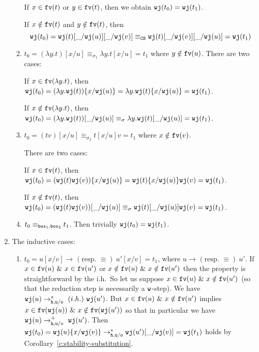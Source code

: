\documentclass{LMCS}
\renewcommand{\>}{\rightarrow}
\def\lam{\lambda}
\def\sig{\sigma}
\newcommand{\Rew}[1]{\rightarrow_{#1}}
\newcommand{\Rewnmod}[2]{\rightarrow^*_{#1/#2}}
\newcommand{\Rewplusmod}[2]{\rightarrow^+_{#1/#2}}
\newcommand{\isubs}[1]{ \{ #1  \} }
\newcommand{\dis}{{\tt j}}
\newcommand{\fv}[1]{{\tt fv}(#1)}
\newcommand{\proj}{\wfc}
\newcommand{\Gc}{{\tt w}}
\newcommand{\CS}{{\tt CS}}
\newcommand{\ih}{i.h.}
\newcommand{\wfc}{\Gc\dis}
\newcommand{\unboxed}{{\tt u}}
\newcommand{\osym}{{\tt o}}
\newcommand{\New}{{\tt h}}
\newcommand{\boite}{{\tt box}}
\newcommand{\sigt}{\boite_1}
\newcommand{\sigq}{\boite_2}
\newcommand{\void}{\_}
\begin{document}
\begin{enumerate}[$\bullet$]
\begin{enumerate}[$-$]
If $x \in \fv{t}$ or $y \in \fv{t}$, then we obtain $\proj(t_0) = \proj(t_1)$.

If $x \notin \fv{t}$ and $y \notin \fv{t}$, then 
$$\proj(t_0) = \proj(t)[\void/\proj(u)][\void/\proj(v)] \equiv_{\CS}
                \proj(t)[\void/\proj(v)][\void/\proj(u)] =\proj(t_1)$$  


\item $t_0 = (\lam y.t)[x/u]  \equiv_{\sig_1}  \lam y.t[x/u]= t_1$   
where $y \notin  \fv{u}$.
There are two  cases:

If $x \in \fv{\lam y. t}$, then $\proj(t_0) = (\lam y. \proj(t))\isubs{x/\proj(u)} = 
                    \lam y. \proj(t)\isubs{x/\proj(u)} =
                    \proj(t_1)$.

If $x \notin \fv{\lam y. t}$, then $\proj(t_0) = (\lam y. \proj(t))[\void/\proj(u)] \equiv_{\sig} 
                    \lam y. \proj(t)[\void/\proj(u)] =
                    \proj(t_1)$.

\item $t_0 = (tv)[x/u]  \equiv_{\sig_2}  t[x/u]v= t_1$   where 
$x \notin  \fv{v}$.

There are two cases:

If $x \in \fv{t}$, then 
$\proj(t_0) = (\proj(t) \proj(v))\isubs{x/\proj(u)}  = 
                   \proj(t)\isubs{x/\proj(u)} \proj(v)  =
                    \proj(t_1)$. 

If  $x \notin \fv{t}$, then 
$\proj(t_0) = (\proj(t) \proj(v))[\void/\proj(u)]  \equiv_{\sig} 
                   \proj(t)[\void/\proj(u)] \proj(v)  =
                    \proj(t_1)$.



\item $t_0 \equiv_{\sigt,\sigq} t_1$. Then trivially  $\proj(t_0) = \proj(t_1)$.


\end{enumerate}

\item The inductive cases:  

\begin{enumerate}[$-$]
\item $t_0 = u[x/v] \Rew{} (\mbox{resp. }  \equiv)\ u'[x/v] = t_1$,
  where $u \Rew{} (\mbox{resp. } \equiv)\ u'$. If $x \in \fv{u}\ \&\ x
  \in \fv{u'}$ or $x \notin \fv{u}\ \&\ x \notin \fv{u'}$ then the
  property is straightforward by the \ih\ So let us suppose $x \in
  \fv{u}\ \&\ x \notin \fv{u'}$ (so that the reduction step is
  necessarily a $\Gc$-step). We have $\proj(u)
  \Rewnmod{\New,\unboxed}{\osym}\ (\ih)\ \proj(u')$. But $x \in
  \fv{u}\ \&\ x \notin \fv{u'}$ 
  implies $x \in
  \fv{\proj(u)}\ \&\ x \notin \fv{\proj(u')}$
  so that in particular we have  $\proj(u)
  \Rewplusmod{\New,\unboxed}{\osym}\ \proj(u')$.
Then $\proj(t_0) =
  \proj(u)\isubs{x/\proj(v)} 
  \Rewnmod{\New,\unboxed}{\osym}
  \proj(u')[\void/\proj(v)] = \proj(t_1)$ holds by Corollary~\ref{c:stability-substitution}.



\end{enumerate}
\end{enumerate}
\end{document}
